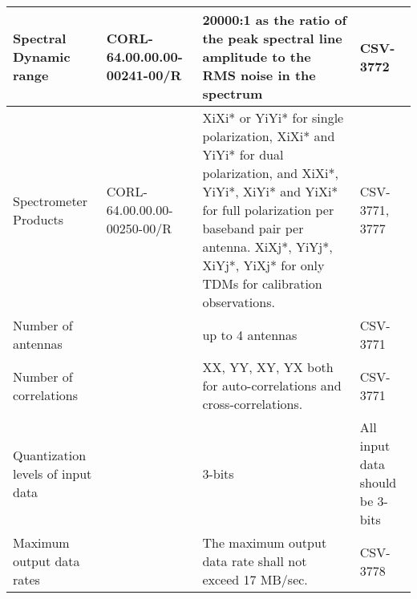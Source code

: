 \begin{longtable}{|p{3cm}|p{2cm}|p{6cm}|p{2cm}|}
Spectral Dynamic range            & CORL-64.00.00.00-00241-00/R                  & 20000:1 as the ratio of the peak spectral line amplitude to the RMS noise in the spectrum                                                                                                                                                    & CSV-3772                                                           \\ \hline
Spectrometer Products             & CORL-64.00.00.00-00250-00/R                  & XiXi* or YiYi* for single polarization, XiXi* and YiYi* for dual polarization, and XiXi*, YiYi*, XiYi* and YiXi* for full polarization per baseband pair per antenna. XiXj*, YiYj*, XiYj*, YiXj* for only TDMs for calibration observations. & CSV-3771, 3777                                               \\ \hline
Number of antennas                &                                              & up to 4 antennas                                                                                                                                                                                                                                   & CSV-3771                                                            \\ \hline
Number of correlations            &                                              & XX, YY, XY, YX both for auto-correlations and cross-correlations.                                                                                                                                                                            & CSV-3771                                                 \\ \hline
Quantization levels of input data &                                              & 3-bits                                                                                                                                                                                                                                       & All input data should be 3-bits                             \\ \hline
Maximum output data rates         &                                              & The maximum output data rate shall not exceed 17 MB/sec.                                                                                                                                                                                     & CSV-3778                                                           \\ \hline

\end{longtable}
